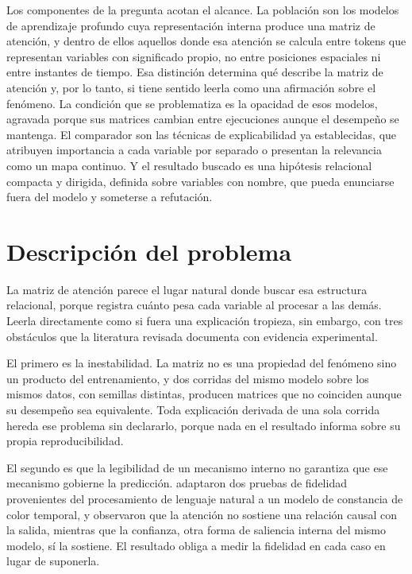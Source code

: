 Los componentes de la pregunta acotan el alcance. La población son los modelos de aprendizaje profundo cuya representación interna produce una matriz de atención, y dentro de ellos aquellos donde esa atención se calcula entre tokens que representan variables con significado propio, no entre posiciones espaciales ni entre instantes de tiempo. Esa distinción determina qué describe la matriz de atención y, por lo tanto, si tiene sentido leerla como una afirmación sobre el fenómeno. La condición que se problematiza es la opacidad de esos modelos, agravada porque sus matrices cambian entre ejecuciones aunque el desempeño se mantenga. El comparador son las técnicas de explicabilidad ya establecidas, que atribuyen importancia a cada variable por separado o presentan la relevancia como un mapa continuo. Y el resultado buscado es una hipótesis relacional compacta y dirigida, definida sobre variables con nombre, que pueda enunciarse fuera del modelo y someterse a refutación.

\section{Descripción del problema}

La matriz de atención parece el lugar natural donde buscar esa estructura relacional, porque registra cuánto pesa cada variable al procesar a las demás. Leerla directamente como si fuera una explicación tropieza, sin embargo, con tres obstáculos que la literatura revisada documenta con evidencia experimental.

El primero es la inestabilidad. La matriz no es una propiedad del fenómeno sino un producto del entrenamiento, y dos corridas del mismo modelo sobre los mismos datos, con semillas distintas, producen matrices que no coinciden aunque su desempeño sea equivalente. Toda explicación derivada de una sola corrida hereda ese problema sin declararlo, porque nada en el resultado informa sobre su propia reproducibilidad.

El segundo es que la legibilidad de un mecanismo interno no garantiza que ese mecanismo gobierne la predicción. \textcite{rizzo2022faithfulness} adaptaron dos pruebas de fidelidad provenientes del procesamiento de lenguaje natural a un modelo de constancia de color temporal, y observaron que la atención no sostiene una relación causal con la salida, mientras que la confianza, otra forma de saliencia interna del mismo modelo, sí la sostiene. El resultado obliga a medir la fidelidad en cada caso en lugar de suponerla.

